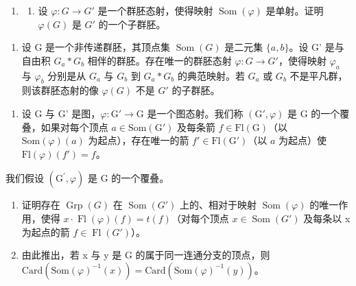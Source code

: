 \begin{enumerate}
\def\labelenumi{\arabic{enumi})}
\setcounter{enumi}{4}
\tightlist
\item
  \begin{enumerate}
  \def\labelenumii{\alph{enumii})}
  \tightlist
  \item
    设 \(\varphi\colon G\to G'\) 是一个群胚态射，使得映射 \(\operatorname{Som}(\varphi)\) 是单射。证明 \(\varphi(G)\) 是 \(G'\) 的一个子群胚。
  \end{enumerate}
\end{enumerate}

\begin{enumerate}
\def\labelenumi{\alph{enumi})}
\setcounter{enumi}{1}
\tightlist
\item
  设 G 是一个非传递群胚，其顶点集 \(\operatorname{Som}(G)\) 是二元集 \(\{a,b\}\)。设 G' 是与自由积 \(G_a*G_b\) 相伴的群胚。存在唯一的群胚态射 \(\varphi:G\to G'\)，使得映射 \(\varphi_a\) 与 \(\varphi_b\) 分别是从 \(G_a\) 与 \(G_b\) 到 \(G_a*G_b\) 的典范映射。若 \(G_a\) 或 \(G_b\) 不是平凡群，则该群胚态射的像 \(\varphi(G)\) 不是 \(G'\) 的子群胚。
\end{enumerate}

\begin{enumerate}
\def\labelenumi{\arabic{enumi})}
\setcounter{enumi}{5}
\tightlist
\item
  设 G 与 G' 是图，\(\varphi\colon\mathrm{G}'\to\mathrm{G}\) 是一个图态射。我们称 \((\mathrm{G}',\varphi)\) 是 G 的一个覆叠，如果对每个顶点 \(a\in\mathrm{Som}(\mathrm{G}')\) 及每条箭 \(f\in\mathrm{Fl}(\mathrm{G})\)（以 \(\mathrm{Som}(\varphi)(a)\) 为起点），存在唯一的箭 \(f'\in\mathrm{Fl}(\mathrm{G}')\)（以 \(a\) 为起点）使 \(\mathrm{Fl}(\varphi)(f')=f\)。
\end{enumerate}

我们假设 \((\mathrm{G}^{\prime},\varphi)\) 是 G 的一个覆叠。

\begin{enumerate}
\def\labelenumi{\alph{enumi})}
\item
  证明存在 \(\operatorname{Grp}(G)\) 在 \(\operatorname{Som}(G')\) 上的、相对于映射 \(\operatorname{Som}(\varphi)\) 的唯一作用，使得 \(x \cdot \operatorname{Fl}(\varphi)(f) = t(f)\)（对每个顶点 \(x \in \operatorname{Som}(G')\) 及每条以 x 为起点的箭 \(f \in \operatorname{Fl}(G')\)）。
\item
  由此推出，若 x 与 y 是 G 的属于同一连通分支的顶点，则 \(\text{Card}(\text{Som}(\varphi)^{-1}(x)) = \text{Card}(\text{Som}(\varphi)^{-1}(y))\)。
\end{enumerate}


